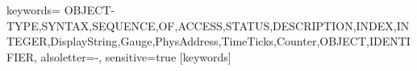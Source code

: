 {keywords=
	{OBJECT-TYPE,SYNTAX,SEQUENCE,OF,ACCESS,STATUS,DESCRIPTION,INDEX,INTEGER,DisplayString,Gauge,PhysAddress,TimeTicks,Counter,OBJECT,IDENTIFIER},
	alsoletter=-,
	sensitive=true %
}[keywords]